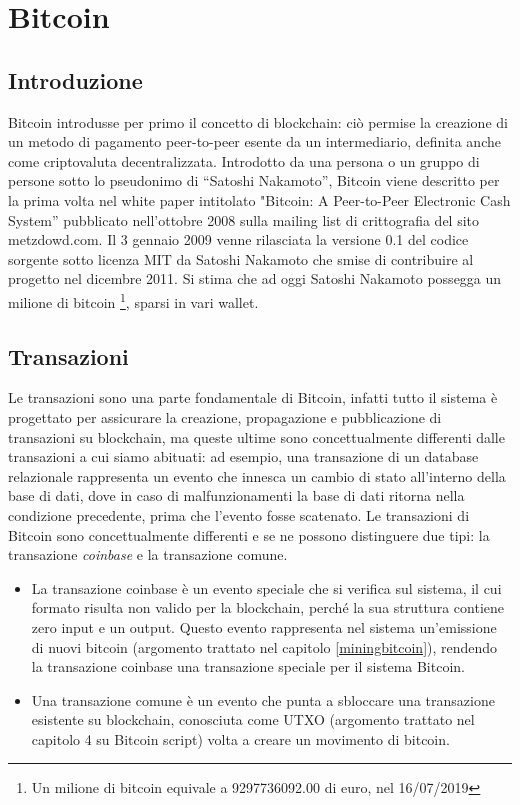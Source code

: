 \chapter{Bitcoin}
\label{chap:bitcoin}

\section{Introduzione}
\label{sec:introduzione}

Bitcoin introdusse per primo il concetto di blockchain: ciò permise la creazione di un metodo di pagamento peer-to-peer esente da un intermediario, definita anche come criptovaluta decentralizzata.
Introdotto da una persona o un gruppo di persone sotto lo pseudonimo di “Satoshi Nakamoto”, Bitcoin viene descritto per la prima volta nel white paper intitolato "Bitcoin: A Peer-to-Peer Electronic Cash System” pubblicato nell’ottobre 2008 sulla mailing list di crittografia del sito metzdowd.com.
Il 3 gennaio 2009 venne rilasciata la versione 0.1 del codice sorgente sotto licenza MIT da Satoshi Nakamoto che smise di contribuire al progetto nel dicembre 2011. Si stima che ad oggi Satoshi Nakamoto possegga un milione di bitcoin \footnote{Un milione di bitcoin equivale a 9297736092.00 di euro, nel 16/07/2019}, sparsi in vari wallet.

\section{Transazioni}
\label{sec:transazionibitcoin}

Le transazioni sono una parte fondamentale di Bitcoin, infatti tutto il sistema è progettato per assicurare la creazione, propagazione e pubblicazione di transazioni su blockchain, ma queste ultime sono concettualmente differenti dalle transazioni a cui siamo abituati: ad esempio, una transazione di un database relazionale rappresenta un evento che innesca un cambio di stato all’interno della base di dati, dove in caso di malfunzionamenti la base di dati ritorna nella condizione precedente, prima che l’evento fosse scatenato.
Le transazioni di Bitcoin sono concettualmente differenti e se ne possono distinguere due tipi: la transazione {\it coinbase\/} e la transazione comune.
\begin{itemize}
  \item La transazione coinbase è un evento speciale che si verifica sul sistema, il cui formato risulta non valido per la blockchain, perché la sua struttura contiene zero input e un output. Questo evento rappresenta nel sistema un’emissione di nuovi bitcoin (argomento trattato nel capitolo \ref{miningbitcoin}), rendendo la transazione coinbase una transazione speciale per il sistema Bitcoin.
  \item Una transazione comune è un evento che punta a sbloccare una transazione esistente su blockchain, conosciuta come UTXO (argomento trattato nel capitolo 4 su Bitcoin script) volta a creare un movimento di bitcoin.
\end{itemize}

